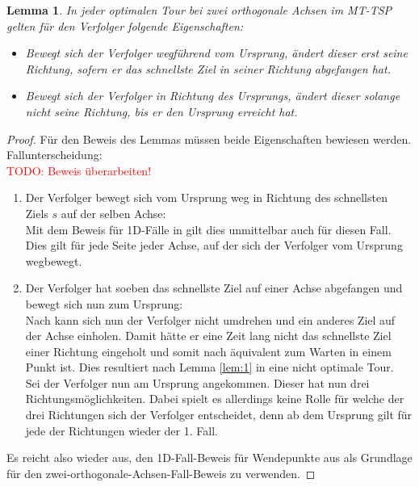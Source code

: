 \documentclass[german,version-2019-11]{uzl-thesis}
\newtheorem{lem}{Lemma}
\begin{document}
\begin{lem}
\label{lem:2}
In jeder optimalen Tour bei zwei orthogonale Achsen im MT-TSP gelten für den Verfolger folgende Eigenschaften:
\begin{itemize}
\item
Bewegt sich der Verfolger wegführend vom Ursprung, ändert dieser erst seine Richtung, sofern er das schnellste Ziel in seiner Richtung abgefangen hat.
\item
Bewegt sich der Verfolger in Richtung des Ursprungs, ändert dieser solange nicht seine Richtung, bis er den Ursprung erreicht hat.
\end{itemize}
\end{lem}

\begin{proof}
Für den Beweis des Lemmas müssen beide Eigenschaften bewiesen werden.\\
Fallunterscheidung:\\
\textcolor{red}{TODO: Beweis überarbeiten!}
\begin{enumerate}
\item Der Verfolger bewegt sich vom Ursprung weg in Richtung des schnellsten Ziels $s$ auf der selben Achse: \\
Mit dem Beweis für 1D-Fälle in \cite{helvig} gilt dies unmittelbar auch für diesen Fall. Dies gilt für jede Seite jeder Achse, auf der sich der Verfolger vom Ursprung wegbewegt.

\item Der Verfolger hat soeben das schnellste Ziel auf einer Achse abgefangen und bewegt sich nun zum Ursprung:\\
Nach \cite{helvig} kann sich nun der Verfolger nicht umdrehen und ein anderes Ziel auf der Achse einholen. Damit hätte er eine Zeit lang nicht das schnellste Ziel einer Richtung eingeholt und somit nach \cite{helvig} äquivalent zum Warten in einem Punkt ist. Dies resultiert nach Lemma \ref{lem:1} in eine nicht optimale Tour.\\
Sei der Verfolger nun am Ursprung angekommen. Dieser hat nun drei Richtungsmöglichkeiten. Dabei spielt es allerdings keine Rolle für welche der drei Richtungen sich der Verfolger entscheidet, denn ab dem Ursprung gilt für jede der Richtungen wieder der 1. Fall.
\end{enumerate} \noindent
Es reicht also wieder aus, den 1D-Fall-Beweis für Wendepunkte aus \cite{helvig} als Grundlage für den zwei-orthogonale-Achsen-Fall-Beweis zu verwenden.
\end{proof}
\end{document}
